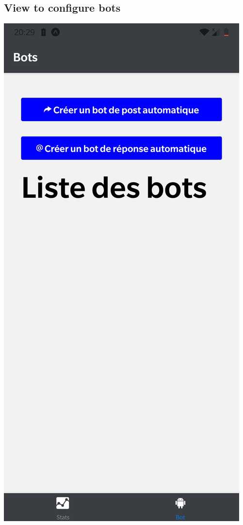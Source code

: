 \documentclass{article}
\begin{document}
\subsection{View to configure bots}
\includegraphics[height=1\textheight]{bots}
\end{document}
